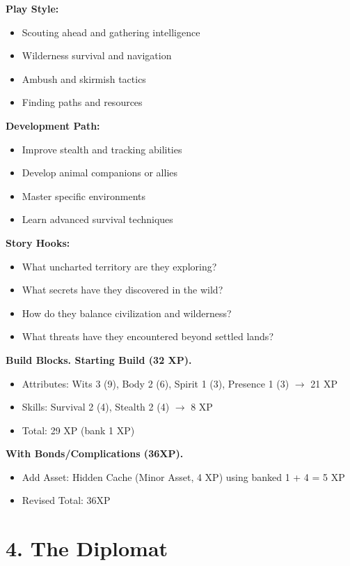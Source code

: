 \documentclass[11pt,twoside,openany]{book}
\begin{document}
\textbf{Play Style:}
\begin{itemize}
\item Scouting ahead and gathering intelligence
\item Wilderness survival and navigation
\item Ambush and skirmish tactics
\item Finding paths and resources
\end{itemize}

\textbf{Development Path:}
\begin{itemize}
\item Improve stealth and tracking abilities
\item Develop animal companions or allies
\item Master specific environments
\item Learn advanced survival techniques
\end{itemize}

\textbf{Story Hooks:}
\begin{itemize}
\item What uncharted territory are they exploring?
\item What secrets have they discovered in the wild?
\item How do they balance civilization and wilderness?
\item What threats have they encountered beyond settled lands?
\end{itemize}

\textbf{Build Blocks. Starting Build (32 XP).}
\begin{itemize}
\item Attributes: Wits 3 (9), Body 2 (6), Spirit 1 (3), Presence 1 (3) $\rightarrow$ 21 XP
\item Skills: Survival 2 (4), Stealth 2 (4) $\rightarrow$ 8 XP
\item Total: 29 XP (bank 1 XP)
\end{itemize}

\textbf{With Bonds/Complications (36XP).}
\begin{itemize}
\item Add Asset: Hidden Cache (Minor Asset, 4 XP) using banked 1 + 4 = 5 XP
\item Revised Total: 36XP
\end{itemize}

\section*{4. The Diplomat} 
\end{document}
